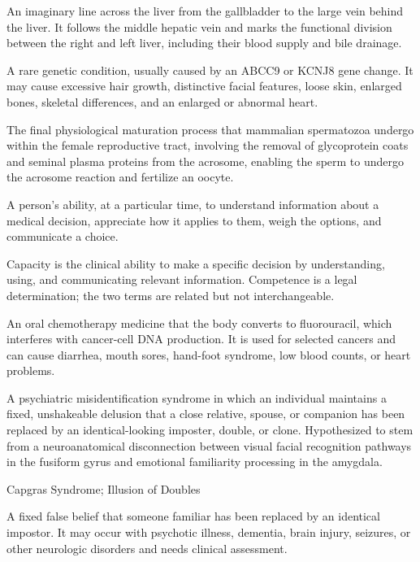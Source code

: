  An imaginary line across the liver from the gallbladder to the large vein behind the liver. It follows the middle hepatic vein and marks the functional division between the right and left liver, including their blood supply and bile drainage.

 A rare genetic condition, usually caused by an ABCC9 or KCNJ8 gene change. It may cause excessive hair growth, distinctive facial features, loose skin, enlarged bones, skeletal differences, and an enlarged or abnormal heart.

 The final physiological maturation process that mammalian spermatozoa undergo within the female reproductive tract, involving the removal of glycoprotein coats and seminal plasma proteins from the acrosome, enabling the sperm to undergo the acrosome reaction and fertilize an oocyte.

 A person's ability, at a particular time, to understand information about a medical decision, appreciate how it applies to them, weigh the options, and communicate a choice.

 Capacity is the clinical ability to make a specific decision by understanding, using, and communicating relevant information. Competence is a legal determination; the two terms are related but not interchangeable.

 An oral chemotherapy medicine that the body converts to fluorouracil, which interferes with cancer-cell DNA production. It is used for selected cancers and can cause diarrhea, mouth sores, hand-foot syndrome, low blood counts, or heart problems.

 A psychiatric misidentification syndrome in which an individual maintains a fixed, unshakeable delusion that a close relative, spouse, or companion has been replaced by an identical-looking imposter, double, or clone. Hypothesized to stem from a neuroanatomical disconnection between visual facial recognition pathways in the fusiform gyrus and emotional familiarity processing in the amygdala.

\synonyms
Capgras Syndrome; Illusion of Doubles

 A fixed false belief that someone familiar has been replaced by an identical impostor. It may occur with psychotic illness, dementia, brain injury, seizures, or other neurologic disorders and needs clinical assessment.

